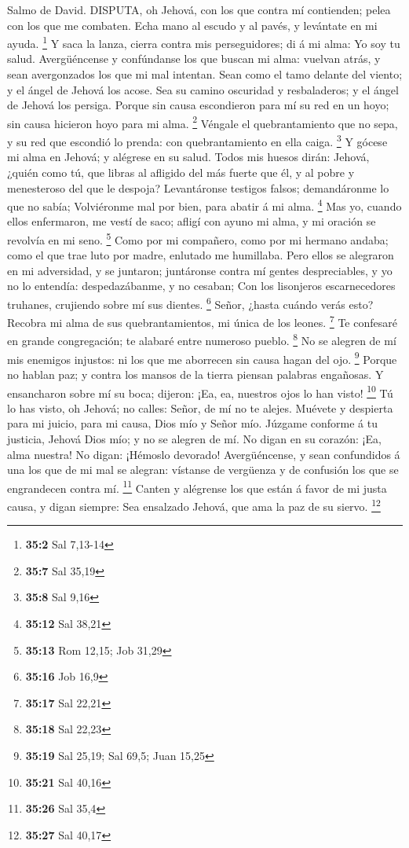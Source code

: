  Salmo de David. DISPUTA, oh Jehová, con los que contra mí
contienden; pelea con los que me combaten.  Echa mano al
escudo y al pavés, y levántate en mi ayuda. \footnote{\textbf{35:2} Sal
  7,13-14}  Y saca la lanza, cierra contra mis
perseguidores; di á mi alma: Yo soy tu salud.  Avergüéncense
y confúndanse los que buscan mi alma: vuelvan atrás, y sean avergonzados
los que mi mal intentan.  Sean como el tamo delante del
viento; y el ángel de Jehová los acose.  Sea su camino
oscuridad y resbaladeros; y el ángel de Jehová los persiga. 
Porque sin causa escondieron para mí su red en un hoyo; sin causa
hicieron hoyo para mi alma. \footnote{\textbf{35:7} Sal 35,19}
 Véngale el quebrantamiento que no sepa, y su red que
escondió lo prenda: con quebrantamiento en ella caiga. \footnote{\textbf{35:8}
  Sal 9,16}  Y gócese mi alma en Jehová; y alégrese en su
salud.  Todos mis huesos dirán: Jehová, ¿quién como tú, que
libras al afligido del más fuerte que él, y al pobre y menesteroso del
que le despoja?  Levantáronse testigos falsos; demandáronme
lo que no sabía;  Volviéronme mal por bien, para abatir á
mi alma. \footnote{\textbf{35:12} Sal 38,21}  Mas yo,
cuando ellos enfermaron, me vestí de saco; afligí con ayuno mi alma, y
mi oración se revolvía en mi seno. \footnote{\textbf{35:13} Rom 12,15;
  Job 31,29}  Como por mi compañero, como por mi hermano
andaba; como el que trae luto por madre, enlutado me humillaba.
 Pero ellos se alegraron en mi adversidad, y se juntaron;
juntáronse contra mí gentes despreciables, y yo no lo entendía:
despedazábanme, y no cesaban;  Con los lisonjeros
escarnecedores truhanes, crujiendo sobre mí sus dientes. \footnote{\textbf{35:16}
  Job 16,9}  Señor, ¿hasta cuándo verás esto? Recobra mi
alma de sus quebrantamientos, mi única de los leones. \footnote{\textbf{35:17}
  Sal 22,21}  Te confesaré en grande congregación; te
alabaré entre numeroso pueblo. \footnote{\textbf{35:18} Sal 22,23}
 No se alegren de mí mis enemigos injustos: ni los que me
aborrecen sin causa hagan del ojo. \footnote{\textbf{35:19} Sal 25,19;
  Sal 69,5; Juan 15,25}  Porque no hablan paz; y contra los
mansos de la tierra piensan palabras engañosas.  Y
ensancharon sobre mí su boca; dijeron: ¡Ea, ea, nuestros ojos lo han
visto! \footnote{\textbf{35:21} Sal 40,16}  Tú lo has
visto, oh Jehová; no calles: Señor, de mí no te alejes. 
Muévete y despierta para mi juicio, para mi causa, Dios mío y Señor mío.
 Júzgame conforme á tu justicia, Jehová Dios mío; y no se
alegren de mí.  No digan en su corazón: ¡Ea, alma nuestra!
No digan: ¡Hémoslo devorado!  Avergüéncense, y sean
confundidos á una los que de mi mal se alegran: vístanse de vergüenza y
de confusión los que se engrandecen contra mí. \footnote{\textbf{35:26}
  Sal 35,4}  Canten y alégrense los que están á favor de mi
justa causa, y digan siempre: Sea ensalzado Jehová, que ama la paz de su
siervo. \footnote{\textbf{35:27} Sal 40,17}

